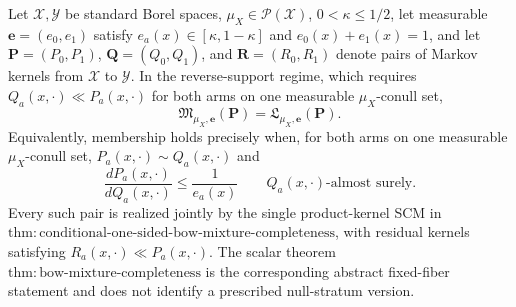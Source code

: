 Let \(\mathcal X,\mathcal Y\) be standard Borel spaces, \(\mu_X\in\mathcal P(\mathcal X)\), \(0<\kappa\le1/2\), let measurable \(\boldsymbol e=(e_0,e_1)\) satisfy \(e_a(x)\in[\kappa,1-\kappa]\) and \(e_0(x)+e_1(x)=1\), and let \(\boldsymbol P=(P_0,P_1)\), \(\boldsymbol Q=(Q_0,Q_1)\), and \(\boldsymbol R=(R_0,R_1)\) denote pairs of Markov kernels from \(\mathcal X\) to \(\mathcal Y\).  In the reverse-support regime, which requires \(Q_a(x,\cdot)\ll P_a(x,\cdot)\) for both arms on one measurable \(\mu_X\)-conull set,
\[
 \mathfrak M_{\mu_X,\boldsymbol e}(\boldsymbol P)=\mathfrak L_{\mu_X,\boldsymbol e}(\boldsymbol P).
\]
Equivalently, membership holds precisely when, for both arms on one measurable \(\mu_X\)-conull set, \(P_a(x,\cdot)\sim Q_a(x,\cdot)\) and
\[
 \frac{dP_a(x,\cdot)}{dQ_a(x,\cdot)}\le\frac1{e_a(x)}\qquad Q_a(x,\cdot)\text{-almost surely}.
\]
Every such pair is realized jointly by the single product-kernel SCM in \(\mathrm{thm:conditional\text{-}one\text{-}sided\text{-}bow\text{-}mixture\text{-}completeness}\), with residual kernels satisfying \(R_a(x,\cdot)\ll P_a(x,\cdot)\).  The scalar theorem \(\mathrm{thm:bow\text{-}mixture\text{-}completeness}\) is the corresponding abstract fixed-fiber statement and does not identify a prescribed null-stratum version.